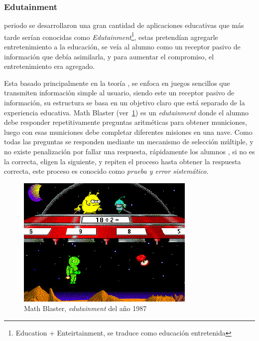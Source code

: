 \subsubsection{Edutainment}

 periodo se desarrollaron una gran cantidad de
aplicaciones educativas que más tarde serían conocidas como
\emph{Edutainment}\footnote{Education + Enteirtainment, se traduce como
    educación entretenida}, estas pretendían agregarle entretenimiento a la
educación, se veía al alumno como un receptor pasivo de información que debía
asimilarla, y para aumentar el compromiso, el entretenimiento era
agregado\cite{resnick:2004}.

Esta basado principalmente en la teoría , se enfoca en juegos
sencillos que transmiten información simple al usuario, siendo este un receptor
pasivo de información, su estructura se basa en un objetivo claro que está
separado de la experiencia educativa\cite{egenfeldt2007third}. Math Blaster
(ver~\ref{fig:math_blaster}) es un \emph{edutainment} donde el alumno debe
responder repetitivamente preguntas aritméticas para obtener municiones, luego
con esas municiones debe completar diferentes misiones en una
nave\cite{bruckman1999can}. Como todas las preguntas se responden mediante un
mecanismo de selección múltiple, y no existe penalización por fallar una
respuesta, rápidamente los alumnos , si no es la correcta, eligen la siguiente, y repiten el proceso
hasta obtener la respuesta correcta, este proceso es conocido como \emph{prueba
    y error sistemático}. 

\begin{figure}[h!] 
	\centering 
	\includegraphics[scale=0.5,natwidth=296,natheight=217]{tics/math_blaster.jpg}
	\caption{Math Blaster, \emph{edutainment} del año 1987}
	\label{fig:math_blaster} 
\end{figure}

